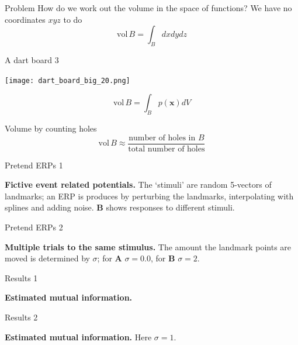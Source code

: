 \documentclass{beamer}
\begin{document}
\begin{frame}{Problem}
\color{black}
How do we work out the volume in the space of functions? We have no coordinates $xyz$ to do
\color{dark}
$$\mbox{vol}\,B=\int_B dxdydz$$
\end{frame}

\begin{frame}{A dart board 3}
\color{reddish}
\begin{center}
\texttt{[image: dart\_board\_big\_20.png]}
\end{center}
\color{dark}
$$\mbox{vol}\,B=\int_B p(\mathbf{x}) dV$$
\color{black}
\end{frame}


\begin{frame}{Volume by counting holes}
\color{dark}
$$\mbox{vol}\,B\approx \frac{\mbox{number of holes in }B}{\mbox{total number of holes}}$$
\end{frame}




\begin{frame}{Pretend ERPs 1}
\color{reddish}
\begin{center}

\end{center}
\color{black} \textbf{Fictive event related potentials.} The
\lq{}stimuli\rq{} are random 5-vectors of landmarks; an ERP is
produces by perturbing the landmarks, interpolating with splines and
adding noise. \textbf{B} shows responses to different stimuli.
\color{black}
\end{frame}


\begin{frame}{Pretend ERPs 2}
\color{reddish}
\begin{center}

\end{center}
\color{black} \textbf{Multiple trials to the same stimulus.} The
amount the landmark points are moved is determined by $\sigma$; for
\textbf{A} $\sigma=0.0$, for \textbf{B} $\sigma=2$.  \color{black}
\end{frame}



\begin{frame}{Results 1}
\color{reddish}
\begin{center}

\color{black} \textbf{Estimated mutual information.} \color{black}
\end{center}
\end{frame}


\begin{frame}{Results 2}
\color{reddish}
\begin{center}
  
\color{black} \textbf{Estimated mutual information.} Here $\sigma=1$. \color{black}
\end{center}
\end{frame}
\end{document}
